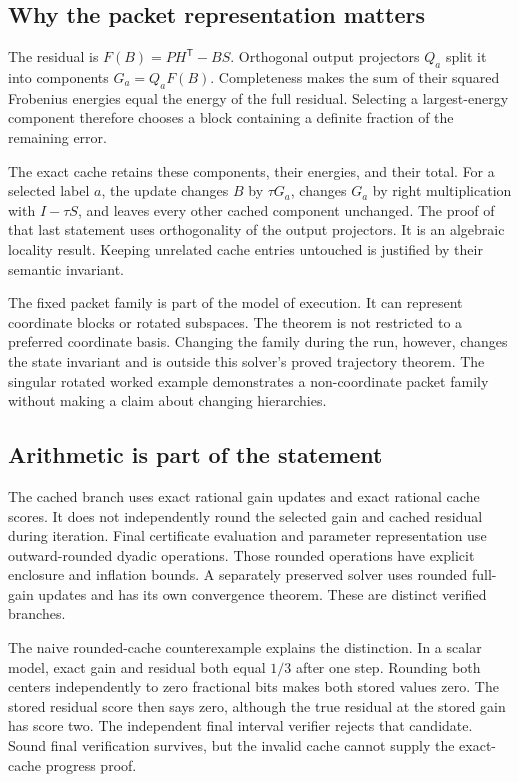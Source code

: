 
\subsection{Why the packet representation matters}
The residual is $F(B)=PH^{\mathsf T}-BS$. Orthogonal output projectors $Q_a$ split it into components $G_a=Q_aF(B)$. Completeness makes the sum of their squared Frobenius energies equal the energy of the full residual. Selecting a largest-energy component therefore chooses a block containing a definite fraction of the remaining error.

The exact cache retains these components, their energies, and their total. For a selected label $a$, the update changes $B$ by $\tau G_a$, changes $G_a$ by right multiplication with $I-\tau S$, and leaves every other cached component unchanged. The proof of that last statement uses orthogonality of the output projectors. It is an algebraic locality result. Keeping unrelated cache entries untouched is justified by their semantic invariant.

The fixed packet family is part of the model of execution. It can represent coordinate blocks or rotated subspaces. The theorem is not restricted to a preferred coordinate basis. Changing the family during the run, however, changes the state invariant and is outside this solver's proved trajectory theorem. The singular rotated worked example demonstrates a non-coordinate packet family without making a claim about changing hierarchies.

\subsection{Arithmetic is part of the statement}
The cached branch uses exact rational gain updates and exact rational cache scores. It does not independently round the selected gain and cached residual during iteration. Final certificate evaluation and parameter representation use outward-rounded dyadic operations. Those rounded operations have explicit enclosure and inflation bounds. A separately preserved solver uses rounded full-gain updates and has its own convergence theorem. These are distinct verified branches.

The naive rounded-cache counterexample explains the distinction. In a scalar model, exact gain and residual both equal $1/3$ after one step. Rounding both centers independently to zero fractional bits makes both stored values zero. The stored residual score then says zero, although the true residual at the stored gain has score two. The independent final interval verifier rejects that candidate. Sound final verification survives, but the invalid cache cannot supply the exact-cache progress proof.

